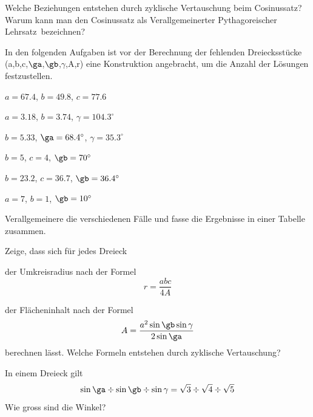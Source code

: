 \documentclass[%
11pt,%
twoside,%
titlepage,%
german,%
headsepline%
]{scrartcl}
\begin{document}
\begin{ueb}
Welche Beziehungen entstehen durch zyklische Vertauschung beim Cosinussatz? Warum kann man den Cosinussatz als \glqq Verallgemeinerter Pythagoreischer Lehrsatz\grqq\ bezeichnen?
\end{ueb}
\begin{ueb}[Konstruktion]
In den folgenden Aufgaben ist vor der Berechnung der fehlenden Dreiecksstücke (a,b,c,$\ga$,$\gb$,$\gamma$,A,r) eine Konstruktion angebracht, um die Anzahl der Lösungen festzustellen.

\begin{minipage}{0.49\textwidth}
\begin{enumeratea}
\item $a=67.4$, $b=49.8$, $c=77.6$
\item $a=3.18$, $b=3.74$, $\gamma=104.3^\circ$
\item $b=5.33$, $\ga=68.4^\circ$, $\gamma=35.3^\circ$
\end{enumeratea}
\end{minipage}
\begin{minipage}{0.49\textwidth}
\begin{enumeratea}
\setcounter{enumi}{3}
\item $b=5$, $c=4$, $\gb=70^\circ$
\item $b=23.2$, $c=36.7$, $\gb=36.4^\circ$
\item $a=7$, $b=1$, $\gb=10^\circ$\\
\end{enumeratea}
\end{minipage}

\noindent Verallgemeinere die verschiedenen Fälle und fasse die Ergebnisse in einer Tabelle zusammen.
\end{ueb}
\begin{ueb}
Zeige, dass sich für jedes Dreieck
\begin{enumeratea}
\item der Umkreisradius nach der Formel
$$r=\frac{abc}{4A}$$
\item der Flächeninhalt nach der Formel
$$A=\frac{a^2\sin\gb\sin\gamma}{2\sin\ga}$$
berechnen lässt. Welche Formeln entstehen durch zyklische Vertauschung?
\end{enumeratea}
\end{ueb}
\begin{ueb}[Winkel]
In einem Dreieck gilt
$$\sin\ga\div\sin\gb\div\sin\gamma=\sqrt{3}\div\sqrt{4}\div\sqrt{5}$$
Wie gross sind die Winkel?
\end{ueb}
\end{document}
